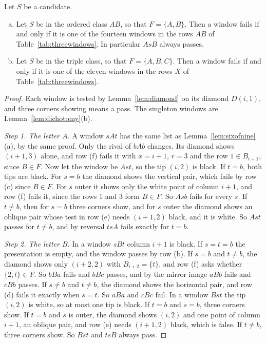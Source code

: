 \begin{lemma}\label{lem:threewindows}
Let $S$ be a candidate.
\begin{enumerate}[(a)]
\item Let $S$ be in the ordered class $AB$, so that $F=\{A,B\}$. Then a window fails if and
only if it is one of the fourteen windows in the rows $AB$ of Table~\ref{tab:threewindows}.
In particular $AsB$ always passes.
\item Let $S$ be in the triple class, so that $F=\{A,B,C\}$. Then a window fails if and only
if it is one of the eleven windows in the rows $X$ of Table~\ref{tab:threewindows}.
\end{enumerate}
\end{lemma}

\begin{proof}
Each window is tested by Lemma~\ref{lem:diamond} on its diamond $D(i,1)$, and three corners
showing means a pass. The singleton windows are Lemma~\ref{lem:dichotomy}(b).

\emph{Step 1. The letter $A$.} A window $sAt$ has the same list as Lemma~\ref{lem:sixofnine}(a),
by the same proof. Only the rival of $bAb$ changes. Its diamond shows $(i+1,3)$ alone, and row
(f) fails it with $x=i+1$, $r=3$ and the row $1\in B_{i+1}$, since $B\in F$. Now let the
window be $Ast$, so the tip $(i,2)$ is black. If $t=b$,
both tips are black. For $s=b$ the diamond shows the vertical pair, which fails by row (c)
since $B\in F$. For $s$ outer it shows only the white point of column $i+1$, and row (f)
fails it, since the rows $1$ and $3$ form $B\in F$. So $Asb$ fails for every $s$. If $t\ne b$,
then for $s=b$ three corners show, and for $s$ outer the diamond shows an oblique pair whose
test in row (e) needs $(i+1,2)$ black, and it is white. So $Ast$ passes for $t\ne b$, and by
reversal $tsA$ fails exactly for $t=b$.

\emph{Step 2. The letter $B$.} In a window $sBt$ column $i+1$ is black. If $s=t=b$ the
presentation is empty, and the window passes by row (b). If $s=b$ and $t\ne b$, the diamond
shows only $(i+2,2)$ with $B_{i+2}=\{t\}$, and row (f) asks whether $\{2,t\}\in F$. So $bBa$
fails and $bBc$ passes, and by the mirror image $aBb$ fails and $cBb$ passes. If $s\ne b$ and
$t\ne b$, the diamond shows the horizontal pair, and row (d) fails it exactly when $s=t$. So
$aBa$ and $cBc$ fail. In a window $Bst$ the tip $(i,2)$ is white, so at most one tip is black.
If $t=b$ and $s=b$, three corners show. If $t=b$ and $s$ is outer, the diamond shows $(i,2)$
and one point of column $i+1$, an oblique pair, and row (e) needs $(i+1,2)$ black, which is
false. If $t\ne b$, three corners show. So $Bst$ and $tsB$ always pass.


\end{proof}
